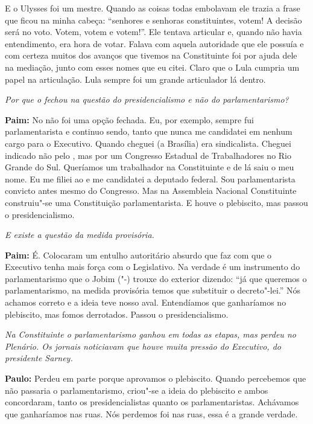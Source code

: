 E o Ulysses foi um mestre. Quando as coisas todas embolavam ele trazia a
frase que ficou na minha cabeça: ``senhores e senhoras constituintes,
votem! A decisão será no voto. Votem, votem e votem!''. Ele tentava
articular e, quando não havia entendimento, era hora de votar. Falava
com aquela autoridade que ele possuía e com certeza muitos dos avanços
que tivemos na Constituinte foi por ajuda dele na mediação, junto com
esses nomes que eu citei. Claro que o Lula cumpria um papel na
articulação. Lula sempre foi um grande articulador lá dentro.

\emph{Por que o  fechou na questão do presidencialismo e não do
parlamentarismo?}

\textbf{Paim:} No  não foi uma opção fechada. Eu, por exemplo, sempre
fui parlamentarista e continuo sendo, tanto que nunca me candidatei em
nenhum cargo para o Executivo. Quando cheguei (a Brasília) era
sindicalista. Cheguei indicado não pelo , mas por um Congresso
Estadual de Trabalhadores no Rio Grande do Sul. Queríamos um trabalhador
na Constituinte e de lá saiu o meu nome. Eu me filiei ao  e me
candidatei a deputado federal. Sou parlamentarista convicto antes mesmo
do Congresso. Mas na Assembleia Nacional Constituinte construiu"-se uma
Constituição parlamentarista. E houve o plebiscito, mas passou o
presidencialismo.

\emph{E existe a questão da medida provisória.}

\textbf{Paim:} É. Colocaram um entulho autoritário absurdo que faz com
que o Executivo tenha mais força com o Legislativo. Na verdade é um
instrumento do parlamentarismo que o Jobim ("-) trouxe do exterior
dizendo: ``já que queremos o parlamentarismo, na medida provisória temos
que substituir o decreto"-lei.'' Nós achamos correto e a ideia teve nosso
aval. Entendíamos que ganharíamos no plebiscito, mas fomos derrotados.
Passou o presidencialismo.

\emph{Na Constituinte o parlamentarismo ganhou em todas as etapas, mas
perdeu no Plenário. Os jornais noticiavam que houve muita pressão do
Executivo, do presidente Sarney.}

\textbf{Paulo:} Perdeu em parte porque aprovamos o plebiscito. Quando
percebemos que não passaria o parlamentarismo, criou"-se a ideia do
plebiscito e ambos concordaram, tanto os presidencialistas quanto os
parlamentaristas. Achávamos que ganharíamos nas ruas. Nós perdemos foi
nas ruas, essa é a grande verdade.

